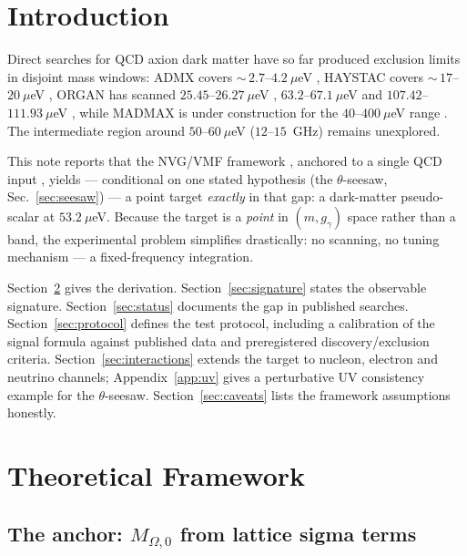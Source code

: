 \documentclass[11pt,a4paper]{article}
\begin{document}
\tableofcontents

\section{Introduction}
\label{sec:intro}

Direct searches for QCD axion dark matter have so far produced exclusion limits
in disjoint mass windows: ADMX covers ${\sim}\,2.7$--$4.2~\mu$eV
\cite{ADMX2018}, HAYSTAC covers ${\sim}\,17$--$20~\mu$eV
\cite{HAYSTAC2025}, ORGAN has scanned $25.45$--$26.27~\mu$eV
\cite{ORGAN26}, $63.2$--$67.1~\mu$eV \cite{ORGAN2022} and
$107.42$--$111.93~\mu$eV \cite{ORGAN1b}, while MADMAX is under construction
for the $40$--$400~\mu$eV range \cite{MADMAX2019}. The intermediate region
around $50$--$60~\mu$eV ($12$--$15$~GHz) remains unexplored.

This note reports that the NVG/VMF framework \cite{NVGrepo}, anchored to a
single QCD input \cite{VMFanchor}, yields --- conditional on one stated
hypothesis (the $\theta$-seesaw, Sec.~\ref{sec:seesaw}) --- a point target
\emph{exactly} in that gap: a dark-matter pseudo-scalar at
$53.2~\mu$eV. Because the target is a \emph{point} in $(m, g_{\gamma})$
space rather than a band, the experimental problem simplifies drastically:
no scanning, no tuning mechanism --- a fixed-frequency integration.

Section~\ref{sec:theory} gives the derivation. Section~\ref{sec:signature}
states the observable signature. Section~\ref{sec:status} documents the gap
in published searches. Section~\ref{sec:protocol} defines the test protocol,
including a calibration of the signal formula against published data and
preregistered discovery/exclusion criteria.
Section~\ref{sec:interactions} extends the target to nucleon, electron and
neutrino channels; Appendix~\ref{app:uv} gives a perturbative UV
consistency example for the $\theta$-seesaw.
Section~\ref{sec:caveats}
lists the framework assumptions honestly.

\section{Theoretical Framework}
\label{sec:theory}

\subsection{The anchor: $M_{\Omega,0}$ from lattice sigma terms}
\end{document}
